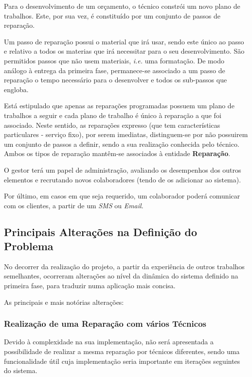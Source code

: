 \documentclass[a4paper,12pt]{scrreprt}
\begin{document}
Para o desenvolvimento de um orçamento, o técnico constrói um novo plano de trabalhos.
Este, por sua vez, é constituído por um conjunto de passos de reparação.

Um passo de reparação possui o material que irá usar, sendo este único ao passo e relativo a todos os materias 
que irá necessitar para o seu desenvolvimento. São permitidos passos que não usem materiais, \textit{i.e.} uma formatação. 
De modo análogo à entrega da primeira fase, permanece-se associado a um passo de reparação o tempo necessário para o desenvolver 
e todos os sub-passos que engloba.

Está estipulado que apenas as reparações programadas possuem um plano de trabalhos a seguir e cada plano de trabalho é único à 
reparação a que foi associado.
Neste sentido, as reparações expresso (que tem características particulares - serviço fixo), por serem imediatas, distinguem-se 
por não possuirem um conjunto de passos a definir, sendo a sua realização conhecida pelo técnico.
Ambos os tipos de reparação mantêm-se associados à entidade \textbf{Reparação}.

O gestor terá um papel de administração, avaliando os desempenhos dos outros elementos e
recrutando novos colaboradores (tendo de os adicionar ao sistema).

Por último, em casos em que seja requerido, um colaborador poderá comunicar com os clientes, a partir de um \textit{SMS} ou \textit{Email}.

\subsection{Principais Alterações na Definição do Problema}\label{princ_alter_prob}

No decorrer da realização do projeto, a partir da experiência de outros trabalhos semelhantes, ocorreram alterações ao
nível da dinâmica do sistema definido na primeira fase, para traduzir numa aplicação mais concisa.

As principais e mais notórias alterações:

\subsubsection{Realização de uma Reparação com vários Técnicos} 
Devido à complexidade na sua implementação, não será apresentada a possibilidade de realizar a mesma reparação por técnicos diferentes, 
sendo uma funcionalidade útil cuja implementação seria importante em iterações seguintes do sistema.
\end{document}
